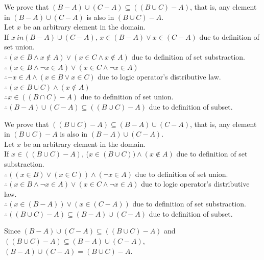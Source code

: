 \documentclass[12pt]{exam}
\begin{document}
\begin{solution}
    \begin{qparts}
        \item We prove that $(B - A) \cup (C - A) \subseteq ((B \cup C) - A)$, that is, any element in $(B - A) \cup (C - A)$ is also in $(B \cup C) - A$.\\
        Let $x$ be an arbitrary element in the domain.\\
        If $x \ in (B - A) \cup (C-A)$, $x \in (B-A) \lor x \in (C-A)$ due to definition of set union.\\
        $\therefore (x \in B \land x \notin A) \lor (x \in C \land x \notin A)$ due to definition of set substraction.\\
        $\therefore (x \in B \land \lnot x \in A) \lor (x \in C \land \lnot x \in A)$\\
        $\therefore \lnot x \in A \land (x \in B \lor x \in C)$ due to logic operator's distributive law.\\
        $\therefore (x \in B \cup C) \land (x \notin A)$\\
        $\therefore x \in ((B \cap C) - A)$ due to definition of set union.\\
        $\therefore (B - A) \cup (C - A) \subseteq ((B \cup C) - A)$ due to definition of subset.
        \item We prove that $((B \cup C) - A) \subseteq (B - A) \cup (C - A)$, that is, any element in $(B \cup C) - A$ is also in $(B - A) \cup (C - A)$.\\
        Let $x$ be an arbitrary element in the domain.\\
        If $x \in ((B \cup C) - A)$, ($x \in (B \cup C)) \land (x \notin A)$ due to definition of set substraction.\\
        $\therefore ((x \in B) \lor (x \in C)) \land (\lnot x \in A)$ due to definition of set union.\\
        $\therefore (x \in B \land \lnot x \in A) \lor (x \in C \land \lnot x \in A)$ due to logic operator's distributive law.\\
        $\therefore (x \in (B - A)) \lor (x \in (C - A))$ due to definition of set substraction.\\
        $\therefore ((B \cup C) - A) \subseteq (B - A) \cup (C - A)$ due to definition of subset.
    \end{qparts}
    Since $(B - A) \cup (C - A) \subseteq ((B \cup C) - A)$ and $((B \cup C) - A) \subseteq (B - A) \cup (C - A)$, 
    \\ $(B - A) \cup (C - A) = (B \cup C) - A$.
\end{solution}
\end{document}
